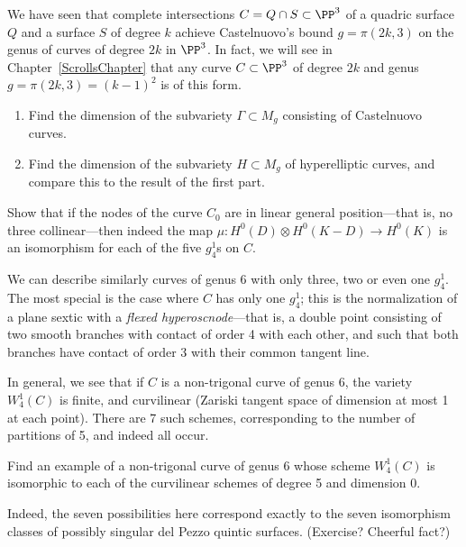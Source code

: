 \begin{exercise}\label{rarity of Castelnuovo}
We have seen that complete intersections $C = Q \cap S \subset \PP^3$ of a quadric surface $Q$ and a surface $S$ of degree $k$ achieve Castelnuovo's bound $g = \pi(2k, 3)$ on the genus of curves of degree $2k$ in $\PP^3$. In fact, we will see in Chapter~\ref{ScrollsChapter} that any curve $C \subset \PP^3$ of degree $2k$ and genus $g = \pi(2k, 3) = (k-1)^2$ is of this form.
\begin{enumerate}
\item Find the dimension of the subvariety $\Gamma \subset M_g$ consisting of Castelnuovo curves.
\item Find the dimension of the subvariety $H \subset M_g$ of hyperelliptic curves, and compare this to the result of the first part.
\end{enumerate}
\end{exercise}


\begin{exercise}\label{nonreduced Wrd}
Show that if the nodes of the curve $C_0$ are in linear general position---that is, no three collinear---then indeed the map $\mu : H^0(D) \otimes H^0(K-D) \to H^0(K)$ is an isomorphism for each of the five $g^1_4$s on $C$.
\end{exercise}

We can describe similarly curves of genus 6 with only three, two or even one $g^1_4$. The most special is the case where $C$ has only one $g^1_4$; this is the normalization of a plane sextic with a \emph{flexed hyperoscnode}---that is, a double point consisting of two smooth branches with contact of order 4 with each other, and such that both branches have contact of order 3 with their common tangent line.

In general, we see that if $C$ is a non-trigonal curve of genus 6, the variety $W^1_4(C)$ is finite, and curvilinear (Zariski tangent space of dimension at most 1 at each point). There are 7 such schemes, corresponding to the number of partitions of 5, and indeed all occur.

\begin{exercise}
Find an example of a non-trigonal curve of genus 6 whose scheme $W^1_4(C)$ is isomorphic to each of the curvilinear schemes of degree 5 and dimension 0.
\end{exercise}

Indeed, the seven possibilities here correspond exactly to the seven isomorphism classes of possibly singular del Pezzo quintic surfaces. (Exercise? Cheerful fact?)




